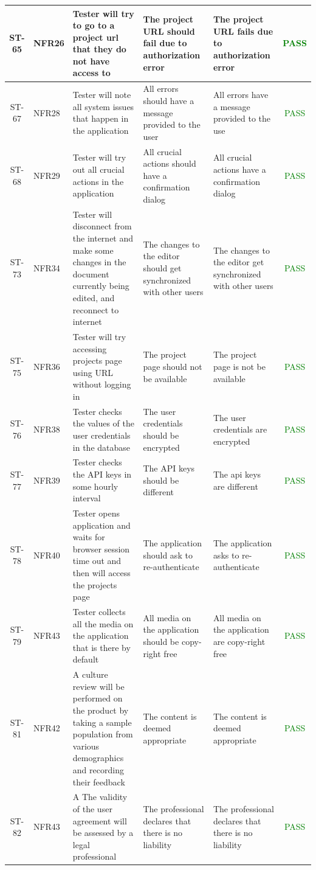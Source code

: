 \documentclass[12pt, titlepage]{article}
\begin{document}
\begin{center}
\begin{longtable}{|c|p{1.2cm}|p{2.7cm}|p{3cm}|p{3cm}|c|}
			\hline
			ST-65 & NFR26 & Tester will try to go to a project url that they do not have access to & The project URL should fail due to authorization error & The project URL fails due to authorization error &  \textcolor{green}{PASS} \\
			\hline
			ST-67 & NFR28 & Tester will note all system issues that happen in the application & All errors should have a message provided to the user & All errors have a message provided to the use &  \textcolor{green}{PASS} \\
			\hline
			ST-68 & NFR29 & Tester will try out all crucial actions in the application & All crucial actions should have a confirmation dialog & All crucial actions have a confirmation dialog &  \textcolor{green}{PASS} \\
			\hline
			ST-73 & NFR34 & Tester will disconnect from the internet and make some changes in the document currently being edited, and reconnect to internet & The changes to the editor should  get synchronized with other users & The changes to the editor get synchronized with other users &  \textcolor{green}{PASS} \\
			\hline
			ST-75 & NFR36 & Tester will try accessing projects page using URL without logging in & The project page should not be available & The project page is not be available &  \textcolor{green}{PASS} \\
			\hline
			ST-76 & NFR38 & Tester checks the values of the user credentials in the database & The user credentials should be encrypted & The user credentials are encrypted &  \textcolor{green}{PASS} \\
			\hline
			ST-77 & NFR39 & Tester checks the API keys in some hourly interval & The API keys should be different & The api keys are different &  \textcolor{green}{PASS} \\
			\hline
			ST-78 & NFR40 & Tester opens application and waits for browser session time out and then will access the projects page & The application should ask to re-authenticate & The application asks to re-authenticate &  \textcolor{green}{PASS} \\
			\hline
			ST-79 & NFR43 & Tester collects all the media on the application that is there by default  & All media on the application should be copy-right free & All media on the application are copy-right free &  \textcolor{green}{PASS} \\
			\hline
			ST-81 & NFR42 & A culture review will be performed on the product by taking a sample population from various demographics and recording their feedback  & The content is deemed appropriate &  The content is deemed appropriate&\textcolor{green}{PASS} \\
			\hline
			ST-82 & NFR43 & A The validity of the user agreement will be assessed by a legal professional  & The professional declares that there is no liability & The professional declares that there is no liability &\textcolor{green}{PASS} \\
			\hline
		\end{longtable}
	\end{center}
	
\end{document}
